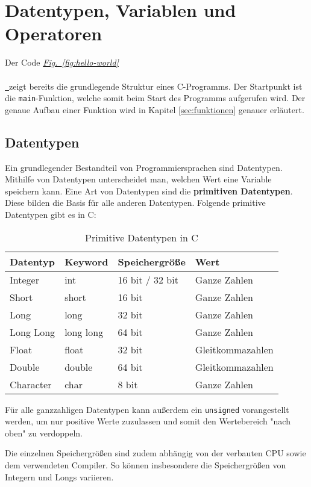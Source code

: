 \documentclass[11pt]{article}
\newcommand*{\figref}[2][]{%
  \hyperref[{fig:#2}]{%
    \textit{Fig.~\ref*{fig:#2}}%
    \ifx\\#1\\%
    \else
      \,#1%
    \fi
  }%
}
\begin{document}
\section{Datentypen, Variablen und Operatoren}
Der Code \figref{hello-world} zeigt bereits die grundlegende Struktur eines C-Programms. Der Startpunkt ist die
\texttt{main}-Funktion, welche somit beim Start des Programms aufgerufen wird. Der genaue Aufbau einer Funktion wird in
Kapitel \ref{sec:funktionen} genauer erläutert.

\subsection{Datentypen}
Ein grundlegender Bestandteil von Programmiersprachen sind Datentypen. Mithilfe von Datentypen unterscheidet man, welchen
Wert eine Variable speichern kann. Eine Art von Datentypen sind die \textbf{primitiven Datentypen}. Diese bilden die Basis
für alle anderen Datentypen. Folgende primitive Datentypen gibt es in C:
\begin{table}[h!]
  \centering
  \begin{tabular}{@{}llll@{}}
    \toprule
    Datentyp  & Keyword   & Speichergröße   & Wert             \\ \midrule
    Integer   & int       & 16 bit / 32 bit & Ganze Zahlen     \\
    Short     & short     & 16 bit          & Ganze Zahlen     \\
    Long      & long      & 32 bit          & Ganze Zahlen     \\
    Long Long & long long & 64 bit          & Ganze Zahlen     \\
    Float     & float     & 32 bit          & Gleitkommazahlen \\
    Double    & double    & 64 bit          & Gleitkommazahlen \\
    Character & char      & 8 bit           & Ganze Zahlen     \\ \bottomrule
  \end{tabular}
  \caption{Primitive Datentypen in C}
\end{table}

Für alle ganzzahligen Datentypen kann außerdem ein \texttt{unsigned} vorangestellt werden, um nur positive Werte
zuzulassen und somit den Wertebereich "nach oben" zu verdoppeln.

Die einzelnen Speichergrößen sind zudem abhängig von der verbauten CPU sowie dem verwendeten Compiler. So können
insbesondere die Speichergrößen von Integern und Longs variieren.
\end{document}

